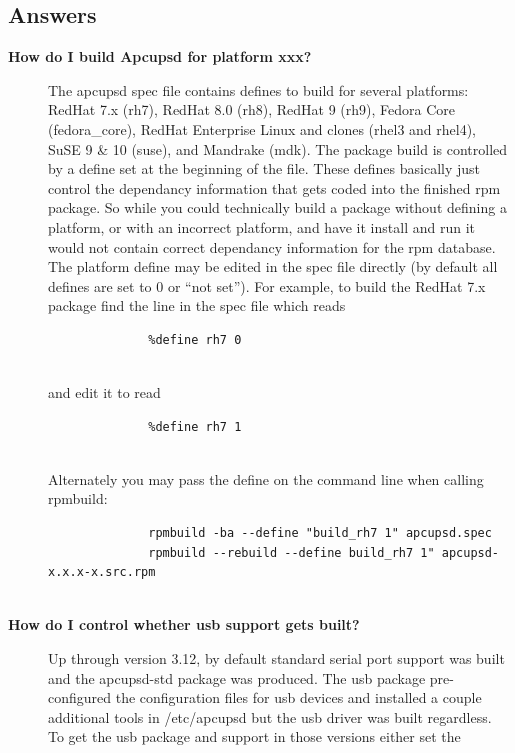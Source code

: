 {{{{{{{{{\label{Answers}

\subsection*{Answers}

\begin{description}

\item [{\bf How do I build Apcupsd for platform xxx?}]
   The apcupsd spec file contains defines to build for several platforms: RedHat
7.x (rh7), RedHat 8.0 (rh8), RedHat 9 (rh9), Fedora Core (fedora\_core), RedHat
Enterprise Linux and clones (rhel3 and rhel4), SuSE 9 \& 10 (suse), and Mandrake (mdk).  
The package build is controlled by a define set at the beginning of the file. 
These defines basically just control the dependancy information that gets coded into 
the finished rpm package.  So while you could technically build a package without 
defining a platform, or with an incorrect platform, and have it install and run it would 
not contain correct dependancy information for the rpm database.  The platform define may
be edited in the spec file directly (by default all defines are set to 0 or
``not set'').  For example, to build the RedHat 7.x package find the line in
the spec file which reads  

\footnotesize
\begin{verbatim}
              %define rh7 0
     
\end{verbatim}
\normalsize

and edit it to read  

\footnotesize
\begin{verbatim}
              %define rh7 1
     
\end{verbatim}
\normalsize

Alternately you may pass the define on the command line when calling rpmbuild:
 

\footnotesize
\begin{verbatim}
              rpmbuild -ba --define "build_rh7 1" apcupsd.spec
              rpmbuild --rebuild --define build_rh7 1" apcupsd-x.x.x-x.src.rpm
     
\end{verbatim}
\normalsize


\item [{\bf How do I control whether usb support gets built?}]
   Up through version 3.12, by default standard serial port support 
was built and the apcupsd-std package was produced.  The usb 
package pre-configured the configuration files for usb devices and 
installed a couple additional tools in /etc/apcupsd but the usb 
driver was built regardless.  To get the usb package and support 
in those versions either set the  


\end{description}}}}}}}}}}
